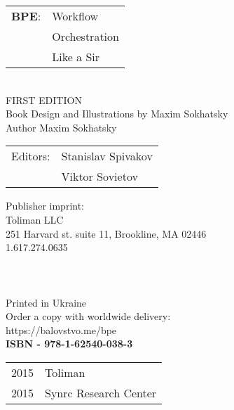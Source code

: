 \begingroup
{}
\parindent 0pt
\parskip
\baselineskip

\begin{tabular}{ll}
{\bf BPE}: & Workflow \\
    & Orchestration \\
    & Like a Sir \\
\end{tabular}
\\

FIRST EDITION \\

Book Design and Illustrations by Maxim Sokhatsky \\
Author Maxim Sokhatsky \\

\begin{tabular}{ll}
Editors: & Stanislav Spivakov \\
         & Viktor Sovietov \\
\end{tabular}

Publisher imprint: \\
Toliman LLC \\
251 Harvard st. suite 11, Brookline, MA 02446 \\
1.617.274.0635 \\
\\
\\
\\



Printed in Ukraine \\

Order a copy with worldwide delivery: \\
https://balovstvo.me/bpe \\

{\bf  ISBN - 978-1-62540-038-3\hspace{2em}}

\begin{tabular}{ll}
\textcopyright{} 2015 & Toliman \\
\textcopyright{} 2015 & Synrc Research Center
\end{tabular}

\endgroup

   \thispagestyle{empty}
